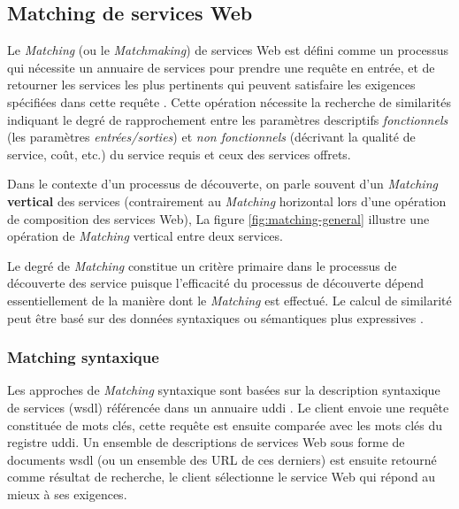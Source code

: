   \subsection{Matching de services Web}
  \label{sec:ws-matching}
  Le \textit{Matching} (ou le \textit{Matchmaking}) de services Web
  est défini comme un processus qui nécessite un annuaire de services
  pour prendre une requête en entrée, et de retourner les services les
  plus pertinents qui peuvent satisfaire les exigences spécifiées dans
  cette requête \cite{li2004software}. Cette opération nécessite la
  recherche de similarités indiquant le degré de rapprochement entre
  les paramètres descriptifs \textit{fonctionnels} (les paramètres
  \textit{entrées/sorties}) et \textit{non fonctionnels} (décrivant la
  qualité de service, coût, etc.) du service requis et ceux des
  services offrets.

  

  Dans le contexte d'un processus de découverte, on parle souvent
  d'un \textit{Matching} \textbf{vertical} des services (contrairement
  au \textit{Matching} horizontal lors d'une opération de composition
  des services Web), La figure \ref{fig:matching-general} illustre une
  opération de \textit{Matching} vertical entre deux services.\medskip

  Le degré de \textit{Matching} constitue un critère primaire dans le
  processus de découverte des service puisque l'efficacité du
  processus de découverte dépend essentiellement de la manière dont
  le \textit{Matching} est effectué. Le calcul de similarité peut être
  basé sur des données syntaxiques ou sémantiques plus expressives
  \cite{elie2010}.

    \subsubsection{Matching syntaxique}
    \label{sec:matching-syntaxique}
    Les approches de \textit{Matching} syntaxique sont basées sur la
    description syntaxique de services (\acrshort{wsdl}) référencée
    dans un annuaire \acrshort{uddi} \cite{clement2004uddi}. Le client
    envoie une requête constituée de mots clés, cette requête est
    ensuite comparée avec les mots clés du registre
    \acrshort{uddi}. Un ensemble de descriptions de services Web sous
    forme de documents \acrshort{wsdl} (ou un ensemble des
    \textsc{URL} de ces derniers) est ensuite retourné comme résultat de
    recherche, le client sélectionne le service Web qui répond au
    mieux à ses exigences.\medskip

